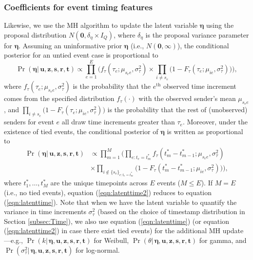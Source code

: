 \documentclass[ba]{imsart}
\numberwithin{equation}{section}
\theoremstyle{plain}
\begin{document}
	\subsubsection{Coefficients for event timing features}
	Likewise, we use the MH algorithm to update the latent variable $\boldsymbol{\eta}$ using the proposal distribution $N(\boldsymbol{0}, \delta_\eta\times I_Q)$, where $\delta_\eta$ is the proposal variance parameter for $\boldsymbol{\eta}$. Assuming an uninformative prior $\boldsymbol{\eta}$ (i.e., $N(\boldsymbol{0},\infty)$), the conditional posterior for an untied event case is proportional to~
	\begin{equation}
		\Pr(\boldsymbol{\eta}|\, \boldsymbol{u}, \boldsymbol{z},\boldsymbol{s}, \boldsymbol{r},\boldsymbol{t})\propto \prod_{e=1}^E\Big(f_{\tau}(\tau_{e}; \mu_{s_e e}, \sigma_\tau^2)\times \prod_{i\neq s_e}\big(1-F_{\tau}(\tau_{e}; \mu_{ie}, \sigma_\tau^2) \big)\Big),
		\label{eqn:latenttime}
	\end{equation}
	where $f_{\tau}(\tau_{e}; \mu_{s_e e}, \sigma_\tau^2)$ is the probability that the $e^{\textrm{th}}$ observed time increment comes from the specified distribution $f_\tau(\cdot)$ with the observed sender's mean $\mu_{s_e e}$, and $\prod_{i\neq s_e}\big(1-F_{\tau}(\tau_{e}; \mu_{ie},\sigma_\tau^2) \big)$ is the probability that the rest of (unobserved) senders for event $e$ all draw time increments greater than $\tau_e$. Moreover, under the existence of tied events, the conditional posterior of $\boldsymbol{\eta}$ is written as proportional to
	\begin{equation}
		\begin{aligned}
			\Pr(\boldsymbol{\eta}|\, \boldsymbol{u}, \boldsymbol{z},\boldsymbol{s}, \boldsymbol{r},\boldsymbol{t})&\propto \prod_{m=1}^M\Big(\prod_{e:t_e=t_m^*}f_{\tau}(t_m^*-t_{m-1}^*; \mu_{s_e e}, \sigma_\tau^2) \\&\times \prod_{i \notin \{s_e\}_{e:t_e=t_m^*}}\big(1-F_{\tau}(t_m^*-t_{m-1}^*; \mu_{ie}, \sigma_\tau^2) \big)\Big),
		\end{aligned}
		\label{eqn:latenttime2}
	\end{equation}
	where $t_1^*,\ldots,t_M^*$ are the unique timepoints across $E$ events ($M \leq E$). If $M=E$ (i.e., no tied events), equation (\ref{eqn:latenttime2}) reduces to equation (\ref{eqn:latenttime}). Note that when we have the latent variable to quantify the variance in time increments $\sigma_\tau^2$ (based on the choice of timestamp distribution in Section \ref{subsec:Time}), we also use equation (\ref{eqn:latenttime}) (or equation (\ref{eqn:latenttime2}) in case there exist tied events) for the additional MH update---e.g., $\Pr(k|\, \boldsymbol{\eta},\boldsymbol{u}, \boldsymbol{z},\boldsymbol{s}, \boldsymbol{r},\boldsymbol{t})$ for Weibull, $\Pr(\theta|\, \boldsymbol{\eta},\boldsymbol{u}, \boldsymbol{z},\boldsymbol{s}, \boldsymbol{r},\boldsymbol{t})$ for gamma, and  $\Pr(\sigma^2_\tau| \,\boldsymbol{\eta},\boldsymbol{u}, \boldsymbol{z},\boldsymbol{s}, \boldsymbol{r},\boldsymbol{t})$ for log-normal.~
\end{document}
